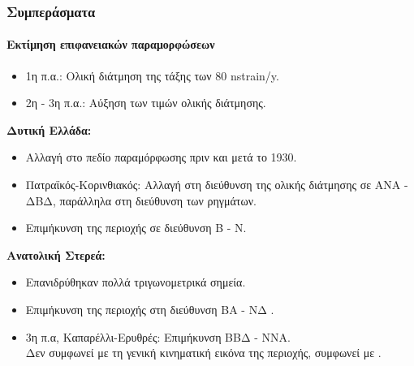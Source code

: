 


\begin{frame}
  \frametitle{Συμπεράσματα}
  \framesubtitle{Εκτίμηση επιφανειακών παραμορφώσεων}
  \label{fr8:concl2}
  \begin{itemize}
    \item 1η π.α.: Ολική διάτμηση της τάξης των 80 nstrain/y.\\
    \item 2η - 3η π.α.: Αύξηση των τιμών ολικής διάτμησης.\\
  \end{itemize}
  \textbf{Δυτική Ελλάδα:}
  \begin{itemize}
    \item Αλλαγή στο πεδίο παραμόρφωσης πριν και μετά το 1930.\\
    \item Πατραϊκός-Κορινθιακός: Αλλαγή στη διεύθυνση της ολικής διάτμησης σε ΑΝΑ - ΔΒΔ, παράλληλα στη διεύθυνση των ρηγμάτων.\\
    \item Επιμήκυνση της περιοχής σε διεύθυνση Β - Ν.\\
  \end{itemize}
  \textbf{Ανατολική Στερεά:}
  \begin{itemize}
    \item Επανιδρύθηκαν πολλά τριγωνομετρικά σημεία.\\
    \item Επιμήκυνση της περιοχής στη διεύθυνση ΒΑ - ΝΔ \parencite{Veis1992,Davies199724571}.\\
    \item 3η π.α, Καπαρέλλι-Ερυθρές: Επιμήκυνση ΒΒΔ - ΝΝΑ.\\
    Δεν συμφωνεί με τη γενική κινηματική εικόνα της περιοχής, συμφωνεί με \textcite{Marinou2015a}. \\
  \end{itemize}
\end{frame}
\note{}










